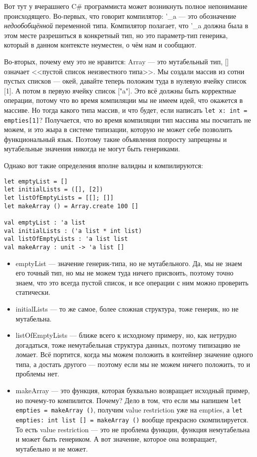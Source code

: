 \documentclass{../../text-style}
\begin{document}
Вот тут у вчерашнего C\# программиста может возникнуть полное непонимание происходящего. Во-первых, что говорит компилятор: '\_a --- это обозначение \emph{недообобщённой} переменной типа. Компилятор полагает, что '\_a должна была в этом месте разрешиться в конкретный тип, но это параметр-тип генерика, который в данном контексте неуместен, о чём нам и сообщают.

Во-вторых, почему ему это не нравится: Array --- это мутабельный тип, [] означает <<пустой список неизвестного типа>>. Мы создали массив из сотни пустых списков --- окей, давайте теперь положим туда в нулевую ячейку список [1]. А потом в первую ячейку список ["a"]. Это всё должны быть корректные операции, потому что во время компиляции мы не имеем идей, что окажется в массиве. Но тогда какого типа массив, и что будет, если написать \texttt{let x: int = empties[1]}? Получается, что во время компиляции тип массива мы посчитать не можем, и это жыра в системе типизации, которую не может себе позволить функциональный язык. Поэтому такие объявления попросту запрещены и мутабельные значения никогда не могут быть генериками.

Однако вот такие определения вполне валидны и компилируются:

\begin{verbatim}
let emptyList = []
let initialLists = ([], [2])
let listOfEmptyLists = [[]; []]
let makeArray () = Array.create 100 []

val emptyList : 'a list
val initialLists : ('a list * int list)
val listOfEmptyLists : 'a list list
val makeArray : unit -> 'a list []
\end{verbatim}

\begin{itemize}
    \item emptyList --- значение генерик-типа, но не мутабельного. Да, мы не знаем его точный тип, но мы не можем туда ничего присвоить, поэтому точно знаем, что это всегда пустой список, и все операции с ним можно проверить статически.
    \item initialLists --- то же самое, более сложная структура, тоже генерик, но не мутабельна.
    \item listOfEmptyLists --- ближе всего к исходному примеру, но, как нетрудно догадаться, тоже немутабельная структура данных, поэтому типизацию не ломает. Всё портится, когда мы можем положить в контейнер значение одного типа, а достать другого --- поэтому если мы не можем ничего положить, то и проблемы нет.
    \item makeArray --- это функция, которая буквально возвращает исходный пример, но почему-то компилится. Почему? Дело в том, что если мы напишем \texttt{let empties = makeArray ()}, получим value restriction уже на empties, а \texttt{let empties: int list [] = makeArray ()} вообще прекрасно скомпилируется. То есть value restriction --- это не проблема функции, функция немутабельна и может быть генериком. А вот значение, которое она возвращает, мутабельно и не может.
\end{itemize}
\end{document}
